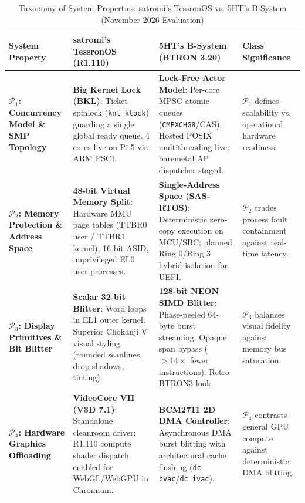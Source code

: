 \documentclass[10pt,journal,compsoc,twocolumn]{article}
\begin{document}
\begin{table}[t]
\centering
\caption{Taxonomy of System Properties: satromi's TessronOS vs. 5HT's B-System (November 2026 Evaluation)}
\label{tab:master_properties}
\scriptsize
\setlength{\tabcolsep}{4.5pt}
\renewcommand{\arraystretch}{1.15}
\begin{tabularx}{\textwidth}{@{} >{\raggedright\arraybackslash\bfseries}p{3.2cm} >{\raggedright\arraybackslash}X >{\raggedright\arraybackslash}X >{\raggedright\arraybackslash}p{2.8cm} @{}}
\toprule
System Property & satromi's TessronOS (R1.110) & 5HT's B-System (BTRON 3.20) & Class Significance \\
\midrule
$\mathcal{P}_1$: Concurrency Model \& SMP Topology &
\textbf{Big Kernel Lock (BKL)}: Ticket spinlock (\texttt{knl\_klock}) guarding a single global ready queue. 4 cores live on Pi 5 via ARM PSCI. &
\textbf{Lock-Free Actor Model}: Per-core MPSC atomic queues (\texttt{CMPXCHG8}/CAS). Hosted POSIX multithreading live; baremetal AP dispatcher staged. &
$\mathcal{P}_1$ defines scalability vs. operational hardware readiness. \\

$\mathcal{P}_2$: Memory Protection \& Address Space &
\textbf{48-bit Virtual Memory Split}: Hardware MMU page tables (TTBR0 user / TTBR1 kernel), 16-bit ASID, unprivileged EL0 user processes. &
\textbf{Single-Address Space (SAS-RTOS)}: Deterministic zero-copy execution on MCU/SBC; planned Ring 0/Ring 3 hybrid isolation for UEFI. &
$\mathcal{P}_2$ trades process fault containment against real-time latency. \\

$\mathcal{P}_3$: Display Primitives \& Bit Blitter &
\textbf{Scalar 32-bit Blitter}: Word loops in EL1 outer kernel. Superior Chokanji V visual styling (rounded scanlines, drop shadows, tinting). &
\textbf{128-bit NEON SIMD Blitter}: Phase-peeled 64-byte burst streaming. Opaque span bypass ($>14\times$ fewer instructions). Retro BTRON3 look. &
$\mathcal{P}_3$ balances visual fidelity against memory bus saturation. \\

$\mathcal{P}_4$: Hardware Graphics Offloading &
\textbf{VideoCore VII (V3D 7.1)}: Standalone cleanroom driver; R1.110 compute shader dispatch enabled for WebGL/WebGPU in Chromium. &
\textbf{BCM2711 2D DMA Controller}: Asynchronous DMA burst blitting with architectural cache flushing (\texttt{dc cvac}/\texttt{dc ivac}). &
$\mathcal{P}_4$ contrasts general GPU compute against deterministic DMA blitting. \\


\end{tabularx}
\end{table}
\end{document}

